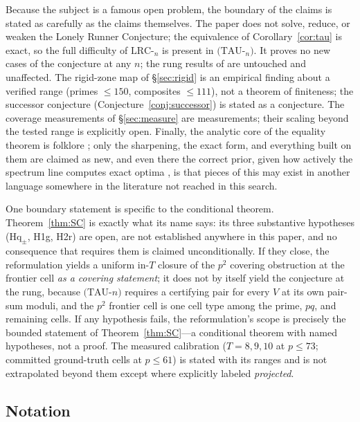 \documentclass[11pt,a4paper]{article}
\numberwithin{equation}{section}
\theoremstyle{plain}
\theoremstyle{plain}
\theoremstyle{definition}
\theoremstyle{remark}
\begin{document}
Because the subject is a famous open problem, the boundary of the claims
is stated as carefully as the claims themselves. The paper does not solve,
reduce, or weaken the Lonely Runner Conjecture; the equivalence of
Corollary~\ref{cor:tau} is exact, so the full difficulty of
$\mathrm{LRC}$-$_n$ is present in $(\mathrm{TAU}$-$_n)$. It proves no new
cases of the conjecture at any $n$; the rung results of
\cite{Rosenfeld8,Trakulthongchai,Sungkawichai,Allikvere} are untouched and
unaffected. The rigid-zone map of \S\ref{sec:rigid} is an empirical
finding about a verified range (primes $\le 150$, composites $\le 111$),
not a theorem of finiteness; the successor conjecture
(Conjecture~\ref{conj:successor}) is stated as a conjecture. The coverage
measurements of \S\ref{sec:measure} are measurements; their scaling
beyond the tested range is explicitly open. Finally, the analytic core of
the equality theorem is folklore \cite{Tao-blog}; only the sharpening, the
exact form, and everything built on them are claimed as new, and even
there the correct prior, given how actively the spectrum line computes
exact optima \cite{Cordella}, is that pieces of this may exist in another
language somewhere in the literature not reached in this search.

One boundary statement is specific to the conditional theorem.
Theorem~\ref{thm:SC} is exactly what its name says: its three substantive
hypotheses ($\mathrm{Hq}_\pm$, H1g, H2r) are open, are not established
anywhere in this paper, and no consequence that requires them is claimed
unconditionally. If they close, the reformulation yields a uniform
in-$T$ closure of the $p^2$ covering obstruction at the frontier cell
\emph{as a covering statement}; it does not by itself yield the
conjecture at the rung, because $(\mathrm{TAU}$-$n)$ requires a certifying
pair for every $V$ at its own pair-sum moduli, and the $p^2$ frontier
cell is one cell type among the prime, $pq$, and remaining cells. If any
hypothesis fails, the reformulation's scope is precisely the bounded
statement of Theorem~\ref{thm:SC}---a conditional theorem with named
hypotheses, not a proof. The measured calibration ($T=8,9,10$ at $p\le73$; committed
ground-truth cells at $p\le61$) is stated with its ranges and is not
extrapolated beyond them except where explicitly labeled
\emph{projected}.

\subsection{Notation}
\end{document}
